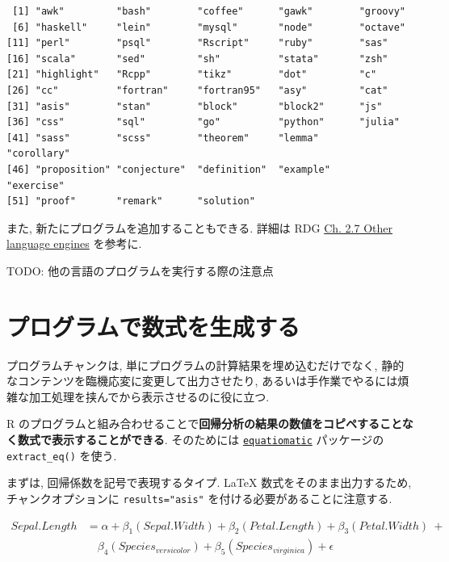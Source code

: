 \documentclass[
  nomag]{bxjsbook}
\theoremstyle{definition}
\theoremstyle{definition}
\theoremstyle{definition}
\theoremstyle{remark}
\begin{document}
\begin{verbatim}
 [1] "awk"         "bash"        "coffee"      "gawk"        "groovy"     
 [6] "haskell"     "lein"        "mysql"       "node"        "octave"     
[11] "perl"        "psql"        "Rscript"     "ruby"        "sas"        
[16] "scala"       "sed"         "sh"          "stata"       "zsh"        
[21] "highlight"   "Rcpp"        "tikz"        "dot"         "c"          
[26] "cc"          "fortran"     "fortran95"   "asy"         "cat"        
[31] "asis"        "stan"        "block"       "block2"      "js"         
[36] "css"         "sql"         "go"          "python"      "julia"      
[41] "sass"        "scss"        "theorem"     "lemma"       "corollary"  
[46] "proposition" "conjecture"  "definition"  "example"     "exercise"   
[51] "proof"       "remark"      "solution"   
\end{verbatim}

また, 新たにプログラムを追加することもできる. 詳細は RDG
\href{https://bookdown.org/yihui/rmarkdown/language-engines.html}{Ch.
2.7 Other language engines} を参考に.

TODO: 他の言語のプログラムを実行する際の注意点

\hypertarget{ux30d7ux30edux30b0ux30e9ux30e0ux3067ux6570ux5f0fux3092ux751fux6210ux3059ux308b}{%
\section{プログラムで数式を生成する}\label{ux30d7ux30edux30b0ux30e9ux30e0ux3067ux6570ux5f0fux3092ux751fux6210ux3059ux308b}}

プログラムチャンクは, 単にプログラムの計算結果を埋め込むだけでなく,
静的なコンテンツを臨機応変に変更して出力させたり,
あるいは手作業でやるには煩雑な加工処理を挟んでから表示させるのに役に立つ.

R
のプログラムと組み合わせることで\textbf{回帰分析の結果の数値をコピペすることなく数式で表示することができる}.
そのためには
\href{https://github.com/datalorax/equatiomatic}{\texttt{equatiomatic}}
パッケージの \texttt{extract\_eq()} を使う.

まずは, 回帰係数を記号で表現するタイプ. LaTeX
数式をそのまま出力するため, チャンクオプションに \texttt{results="asis"}
を付ける必要があることに注意する.

\[
\begin{aligned}
Sepal.Length &= \alpha + \beta_{1}(Sepal.Width) + \beta_{2}(Petal.Length) + \beta_{3}(Petal.Width)\ + \\
&\quad \beta_{4}(Species_{versicolor}) + \beta_{5}(Species_{virginica}) + \epsilon
\end{aligned}
\]
\end{document}
